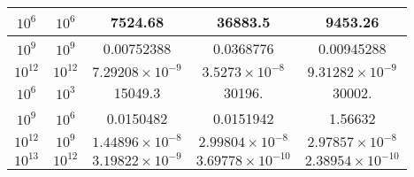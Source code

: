\documentclass[aps,prl,tightenlines,onecolumn,superscriptaddress]{revtex4}
\begin{document}
\begin{table}[H]
\begin{center}
\begin{tabular} {|c|c|c|c|c|}
  \hline
  $10^{6}$ &\hspace{1cm} $10^{6}$ &\hspace{1cm} 7524.68 &\hspace{1cm} 36883.5 &\hspace{1cm} 9453.26 \\
  \hline
  $10^{9}$ &\hspace{1cm} $10^{9}$ &\hspace{1cm} 0.00752388 &\hspace{1cm} 0.0368776 &\hspace{1cm} 0.00945288 \\
  \hline
$10^{12}$ &\hspace{1cm} $10^{12}$ &\hspace{1cm} $7.29208\times10^{-9}$ &\hspace{1cm} $3.5273\times10^{-8}$ &\hspace{1cm} $9.31282\times10^{-9}$ \\
  \hline
  \hline
  $10^{6}$ &\hspace{1cm} $10^{3}$ &\hspace{1cm} 15049.3 &\hspace{1cm} 30196. &\hspace{1cm} 30002. \\
  \hline
  $10^{9}$ &\hspace{1cm} $10^{6}$ &\hspace{1cm} 0.0150482 &\hspace{1cm} 0.0151942 &\hspace{1cm} 1.56632 \\
  \hline
  $10^{12}$ &\hspace{1cm} $10^{9}$ &\hspace{1cm}$1.44896\times10^{-8}$ &\hspace{1cm} $2.99804\times10^{-8}$ &\hspace{1cm} $2.97857\times10^{-8}$ \\
  \hline
$10^{13}$ &\hspace{1cm} $10^{12}$ &\hspace{1cm}$3.19822\times10^{-9}$ &\hspace{1cm} $3.69778\times10^{-10}$ &\hspace{1cm} $2.38954\times10^{-10}$ \\
\hline
  \end{tabular}
 \hfill
  \end{center}
\end{table}
\end{document}
